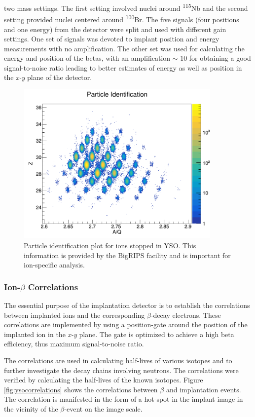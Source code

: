 two mass settings. The first setting involved nuclei around \textsuperscript{115}Nb and the second setting provided nuclei centered around \textsuperscript{100}Br. 
The five signals (four positions and one energy) from the detector were split and used with different gain settings. One set of signals was devoted to implant position and energy measurements with no amplification. The other set was used for calculating the energy and position of the betas, with an amplification $\sim$ 10 for obtaining a good signal-to-noise ratio leading to better estimates of energy as well as position in the \textit{x-y} plane of the detector.


\begin{figure}[h!]
    \centering
    \includegraphics[width=10cm, height=8cm]{figures/yso_pid_2.png}
    \caption[Particle identification plot for ions stopped in YSO]{Particle identification plot for ions stopped in YSO. This information is provided by the BigRIPS facility and is important for ion-specific analysis.}
    \label{fig:particleidentification}
\end{figure}

\subsubsection{Ion-$\beta$ Correlations}
The essential purpose of the implantation detector is to establish the correlations between implanted ions and the corresponding $\beta$-decay electrons. These correlations are implemented by using a position-gate around the position of the implanted ion in the \textit{x-y} plane. The gate is optimized to achieve a high beta efficiency, thus maximum signal-to-noise ratio. 

The correlations are used in calculating half-lives of various isotopes and to further investigate the decay chains involving neutrons. The correlations were verified by calculating the half-lives of the known isotopes. Figure \ref{fig:ysocorrelations} shows the correlations between $\beta$ and implantation events. The correlation is manifested in the form of a hot-spot in the implant image in the vicinity of the $\beta$-event on the image scale. 

